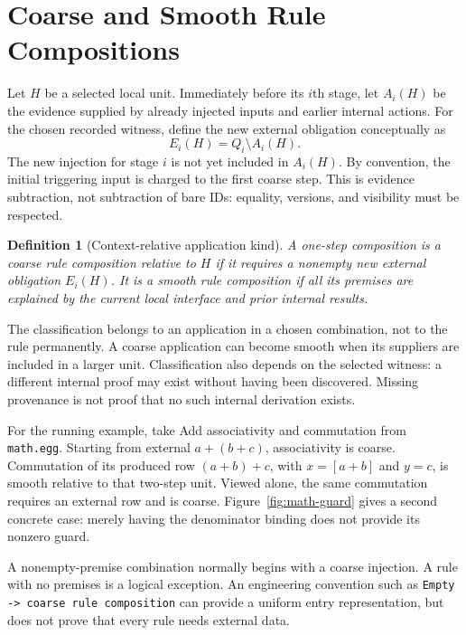 \documentclass[11pt,a4paper]{article}
\newtheorem{definition}{Definition}
\newcommand{\code}[1]{\texttt{#1}}
\begin{document}
\MathBinding

\section{Coarse and Smooth Rule Compositions}
Let $H$ be a selected local unit. Immediately before its $i$th stage, let $A_i(H)$
be the evidence supplied by already injected inputs and earlier internal actions.
For the chosen recorded witness, define the new external obligation conceptually
as
\begin{equation}
 E_i(H)=Q_i\setminus A_i(H).
\end{equation}
The new injection for stage $i$ is not yet included in $A_i(H)$. By convention,
the initial triggering input is charged to the first coarse step.
This is evidence subtraction, not subtraction of bare IDs: equality, versions,
and visibility must be respected.

\begin{definition}[Context-relative application kind]
A one-step composition is a \emph{coarse rule composition} relative to $H$ if it requires a nonempty
new external obligation $E_i(H)$. It is a \emph{smooth rule composition} if all its premises
are explained by the current local interface and prior internal results.
\end{definition}

The classification belongs to an application in a chosen combination, not to the
rule permanently. A coarse application can become smooth when its suppliers are
included in a larger unit. Classification also depends on the selected witness:
a different internal proof may exist without having been discovered. Missing
provenance is not proof that no such internal derivation exists.

For the running example, take Add associativity and commutation from
\texttt{math.egg}. Starting from external $a+(b+c)$, associativity is coarse.
Commutation of its produced row $(a+b)+c$, with $x=[a+b]$ and $y=c$, is smooth
relative to that two-step unit. Viewed alone, the same commutation requires an
external row and is coarse. Figure~\ref{fig:math-guard} gives a second concrete
case: merely having the denominator binding does not provide its nonzero guard.

A nonempty-premise combination normally begins with a coarse injection. A rule
with no premises is a logical exception. An engineering convention such as
\code{Empty -> coarse rule composition} can provide a uniform entry representation, but does
not prove that every rule needs external data.
\end{document}
